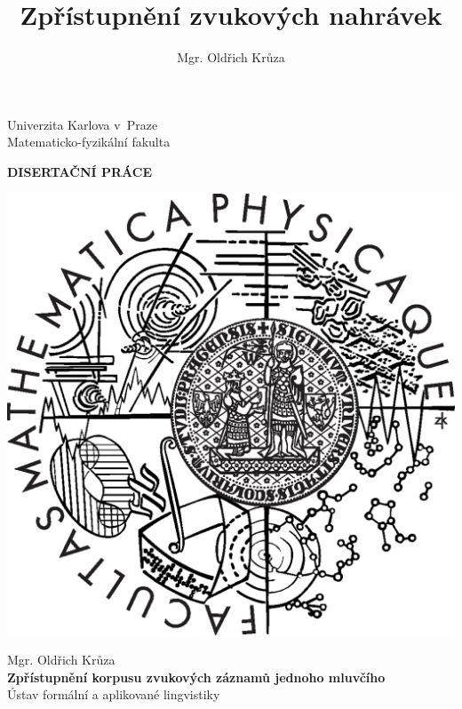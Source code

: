 \documentclass[12pt,notitlepage]{report}
\title{Zpřístupnění zvukových nahrávek}   %
\author{Mgr. Oldřich Krůza} %
\begin{document}


\begin{titlepage}
\begin{center}

\vspace{15mm}

\large
Univerzita Karlova v~Praze\\
Matematicko-fyzikální fakulta\\

\vspace{5mm}

{\Large\bf DISERTAČNÍ PRÁCE}

\vspace{25mm}

\includegraphics[scale=0.5]{rc/mff-logo.eps} 

\vspace{25mm}


Mgr. Oldřich Krůza\\
\vspace{5mm}
{\Large\bf Zpřístupnění korpusu zvukových záznamů jednoho mluvčího}\\
\vspace{5mm}
Ústav formální a aplikované lingvistiky\\
\end{center}
\vspace{10mm}


\end{titlepage}
\end{document}
